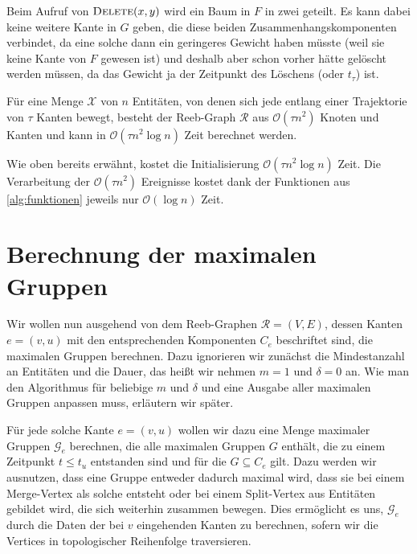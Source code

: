 Beim Aufruf von $\textsc{Delete}(x,y)$ wird ein Baum in $F$ in zwei geteilt.
Es kann dabei keine weitere Kante in $G$ geben, die diese beiden Zusammenhangskomponenten verbindet, da eine solche dann ein geringeres Gewicht haben müsste (weil sie keine Kante von $F$ gewesen ist) und deshalb aber schon vorher hätte gelöscht werden müssen, da das Gewicht ja der Zeitpunkt des Löschens (oder $t_\tau$) ist.

\begin{satz}[{name={\cite[Thm.~7]{buchin2015}}}]
	Für eine Menge $\mathcal{X}$ von $n$ Entitäten, von denen sich jede entlang einer Trajektorie von $\tau$ Kanten bewegt, besteht der Reeb-Graph $\mathcal{R}$ aus $\mathcal{O}(\tau n^2)$ Knoten und Kanten und kann in $\mathcal{O}(\tau n^2 \log n)$ Zeit berechnet werden.
\end{satz}
\begin{beweis}
	Wie oben bereits erwähnt, kostet die Initialisierung $\mathcal{O}(\tau n^2 \log n)$ Zeit.
	Die Verarbeitung der $\mathcal{O}(\tau n^2)$ Ereignisse kostet dank der Funktionen aus \cref{alg:funktionen} jeweils nur $\mathcal{O}(\log n)$ Zeit.
\end{beweis}

\section{Berechnung der maximalen Gruppen} %
\label{sec:berechnung_maximale_gruppen}
Wir wollen nun ausgehend von dem Reeb-Graphen $\mathcal{R}=(V,E)$, dessen Kanten $e=(v,u)$ mit den entsprechenden Komponenten $C_e$ beschriftet sind, die maximalen Gruppen berechnen.
Dazu ignorieren wir zunächst die Mindestanzahl an Entitäten und die Dauer, das heißt wir nehmen $m=1$ und $\delta=0$ an.
Wie man den Algorithmus für beliebige $m$ und $\delta$ und eine Ausgabe aller maximalen Gruppen anpassen muss, erläutern wir später.

Für jede solche Kante $e=(v,u)$ wollen wir dazu eine Menge maximaler Gruppen $\mathcal{G}_e$ berechnen, die alle maximalen Gruppen $G$ enthält, die zu einem Zeitpunkt $t \le t_u$ entstanden sind und für die $G \subseteq C_e$ gilt.
Dazu werden wir ausnutzen, dass eine Gruppe entweder dadurch maximal wird, dass sie bei einem Merge-Vertex als solche entsteht oder bei einem Split-Vertex aus Entitäten gebildet wird, die sich weiterhin zusammen bewegen.
Dies ermöglicht es uns, $\mathcal{G}_e$ durch die Daten der bei $v$ eingehenden Kanten zu berechnen, sofern wir die Vertices in topologischer Reihenfolge traversieren.


